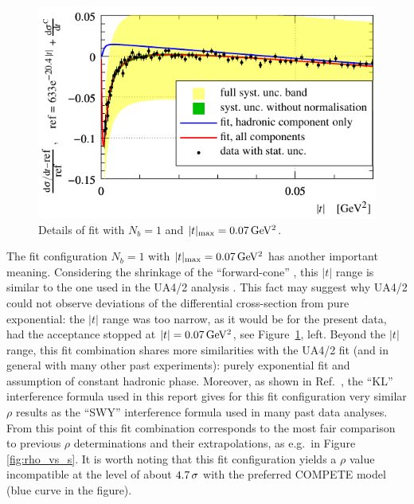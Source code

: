\begin{figure}
\vskip-5mm
\begin{center}
\includegraphics{fig/fit_details_exp1_0p07.pdf}
\vskip-2mm
\caption{%
Details of fit with $N_b = 1$ and $|t|_{\rm max} = 0.07\,{\rm GeV^2}$.
}
\label{fig:fit exp1 0.07}
\end{center}
\end{figure}


The fit configuration $N_b=1$ with $|t|_{\rm max} = 0.07\,{\rm GeV^2}$ has another important meaning. Considering the shrinkage of the ``forward-cone'' , this $|t|$ range is similar to the one used in the UA4/2 analysis \cite{ua4-rho}. This fact may suggest why UA4/2 could not observe deviations of the differential cross-section from pure exponential: the $|t|$ range was too narrow, as it would be for the present data, had the acceptance stopped at $|t| = 0.07\,{\rm GeV^2}$, see Figure~\ref{fig:fit exp1 0.07}, left. Beyond the $|t|$ range, this fit combination shares more similarities with the UA4/2 fit (and in general with many other past experiments): purely exponential fit and assumption of constant hadronic phase. Moreover, as shown in Ref.~\cite{totem-8tev-1km}, the ``KL'' interference formula \cite{kl94} used in this report gives for this fit configuration very similar $\rho$ results as the ``SWY'' interference formula \cite{wy68} used in many past data analyses. From this point of this fit combination corresponds to the most fair comparison to previous $\rho$ determinations and their extrapolations, as e.g.~in Figure \ref{fig:rho_vs_s}. It is worth noting that this fit configuration yields a $\rho$ value incompatible at the level of about $4.7\,{\rm \sigma}$ %
with the preferred COMPETE model (blue curve in the figure).

